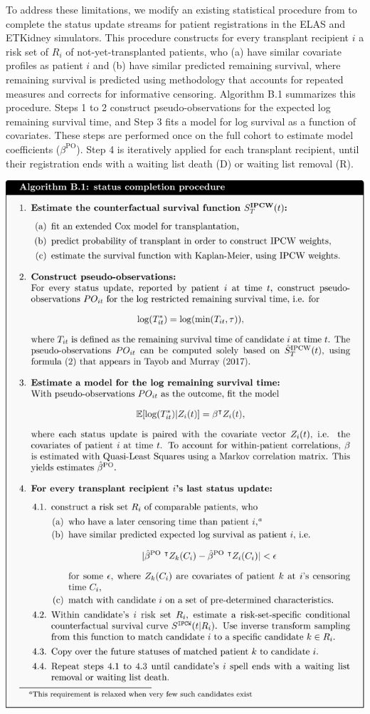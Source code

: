 \documentclass[11pt,twoside,]{book}
\begin{document}
To address these limitations, we modify an existing statistical procedure from \citet{tayobstatistical2017} to complete the status update streams for patient
registrations in the ELAS and ETKidney simulators. This procedure constructs for every transplant recipient \(i\) a risk set of
\(R_i\) of not-yet-transplanted patients, who (a) have similar covariate profiles as patient \(i\) and (b)
have similar predicted remaining survival, where remaining survival is predicted
using methodology that accounts for repeated measures and corrects for informative
censoring. Algorithm B.1 summarizes this procedure. Steps 1 to 2 construct pseudo-observations for the expected log remaining survival time,
and Step 3 fits a model for log survival as a function of covariates.
These steps are performed once on the full cohort to estimate model
coefficients (\(\beta^{\text{PO}}\)). Step 4 is iteratively applied for each
transplant recipient, until their registration ends with a waiting list death (D)
or waiting list removal (R).

\begin{center}\includegraphics[width=1\linewidth]{figures/appendix/flowchart} \end{center}
\end{document}
